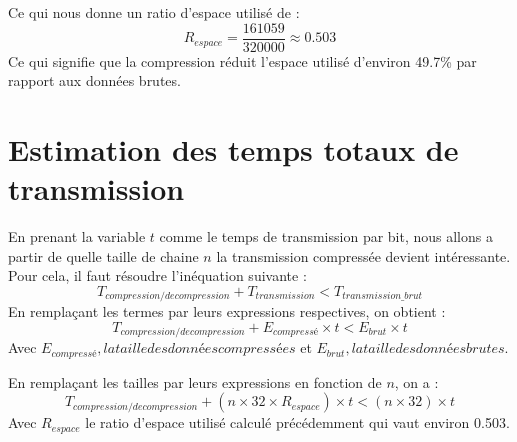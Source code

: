 \documentclass{rapportClass} %
\begin{document}
Ce qui nous donne un ratio d'espace utilisé de :
\begin{equation}
    R_{espace} = \frac{161059}{320000} \approx 0.503
\end{equation}
Ce qui signifie que la compression réduit l'espace utilisé d'environ 49.7\% par rapport aux données brutes.


\section{Estimation des temps totaux de transmission}
En prenant la variable $t$ comme le temps de transmission par bit, nous allons a partir de quelle taille de chaine $n$ la transmission compressée devient intéressante.
Pour cela, il faut résoudre l'inéquation suivante :
\begin{equation}
    T_{compression/decompression} + T_{transmission} < T_{transmission\_brut}
\end{equation}
En remplaçant les termes par leurs expressions respectives, on obtient :
\begin{equation}
    T_{compression/decompression} + E_{compressé} \times t < E_{brut} \times t
\end{equation}
Avec $E_{compressé}, la taille des données compressées$ et $E_{brut}, la taille des données brutes$.


En remplaçant les tailles par leurs expressions en fonction de $n$, on a :
\begin{equation}
    T_{compression/decompression} + (n \times 32 \times R_{espace}) \times t < (n \times 32) \times t
\end{equation}
Avec $R_{espace}$ le ratio d'espace utilisé calculé précédemment qui vaut environ 0.503.
\end{document}
